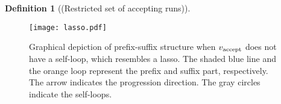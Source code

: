 \documentclass[Afour,sageh,times]{sagej}
\newtheorem{defn}[thm]{Definition}
\newcommand{\vertex}[1]{v_{\textup{#1}}}
\newcommand{\simplies}{\DOTSB\Longrightarrow}
\begin{document}
\begin{defn}[(Restricted set of accepting runs)]
 \end{defn}

\begin{figure}[t]
  \centering
  \texttt{[image: lasso.pdf]}
  \caption{Graphical depiction of prefix-suffix structure when $\vertex{accept}$ does not have a self-loop, which resembles a lasso. The shaded blue line and the orange loop represent the prefix and suffix part, respectively. The arrow indicates the progression direction. The gray circles indicate the self-loops.}
  \label{fig:lasso}
\end{figure}
\end{document}
